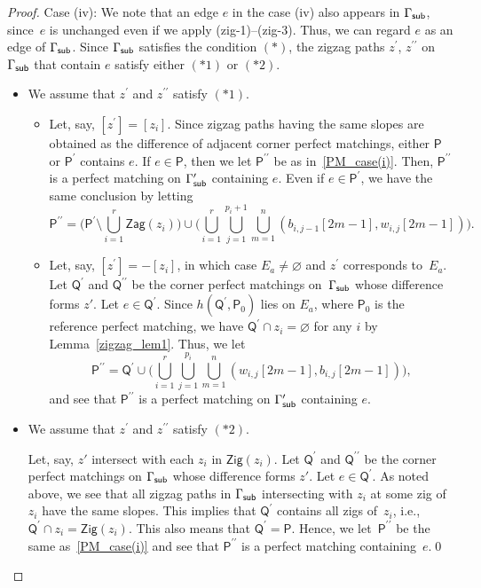 \documentclass[11pt]{article}
\numberwithin{equation}{section}
\numberwithin{equation}{section}
\numberwithin{figure}{section}
\numberwithin{table}{section}
\newcommand{\sfP}{\mathsf{P}}
\newcommand{\sfQ}{\mathsf{Q}}
\newcommand{\Zig}{\mathsf{Zig}}
\newcommand{\Zag}{\mathsf{Zag}}
\begin{document}
\begin{proof}
Case (iv): We note that an edge $e$ in the case (iv) also appears in $\Gamma_{\sf sub}$, since~$e$ is unchanged even if we apply (zig-1)--(zig-3).
Thus, we can regard $e$ as an edge of $\Gamma_{\sf sub}$.
Since $\Gamma_{\sf sub}$ satisfies the condition $(*)$, the zigzag paths $z^\prime$, $z^{\prime\prime}$ on~$\Gamma_{\sf sub}$ that contain $e$ satisfy
either $(*1)$ or $(*2)$.
\begin{itemize}\itemsep=0pt
\item We assume that $z^\prime$ and $z^{\prime\prime}$ satisfy $(*1)$.
\begin{itemize}\itemsep=0pt
\item Let, say, $[z^\prime]=[z_i]$.
Since zigzag paths having the same slopes are obtained as the difference of adjacent corner perfect matchings, either $\sfP$ or $\sfP^\prime$ contains $e$.
If $e \in \sfP$, then we let $\sfP^{\prime\prime}$ be as in~\eqref{PM_case(i)}.
Then, $\sfP^{\prime\prime}$ is a perfect matching on $\Gamma^\prime_{\sf sub}$ containing $e$.
Even if $e \in \sfP^\prime$, we have the same conclusion by letting
\begin{displaymath}
\sfP^{\prime\prime}=\bigg(\sfP^\prime \setminus \bigcup_{i=1}^r \Zag(z_i)\bigg) \cup \bigg(\bigcup_{i=1}^r \bigcup_{j=1}^{p_i+1} \bigcup_{m=1}^n(b_{i,j-1}[2m-1],w_{i,j}[2m-1])\bigg).
\end{displaymath}
\item Let, say, $[z^\prime]=-[z_i]$, in which case $E_a\neq \varnothing$ and $z^\prime$ corresponds to~$E_a$.
Let $\sfQ^\prime$ and $\sfQ^{\prime\prime}$ be the corner perfect matchings on~$\Gamma_{\sf sub}$ whose difference forms $z'$. Let $e \in \sfQ^\prime$.
Since $h(\sfQ^\prime,\sfP_0)$ lies on $E_a$, where $\sfP_0$ is the reference perfect matching, we have $\sfQ^\prime\cap z_i=\varnothing$ for any $i$ by Lemma~\ref{zigzag_lem1}.
Thus, we let
\begin{displaymath}
\sfP^{\prime\prime}=\sfQ^\prime \cup \bigg(\bigcup_{i=1}^r \bigcup_{j=1}^{p_i} \bigcup_{m=1}^n(w_{i,j}[2m-1],b_{i,j}[2m-1])\bigg),
\end{displaymath}
and see that $\sfP^{\prime\prime}$ is a perfect matching on $\Gamma^\prime_{\sf sub}$ containing $e$.
\end{itemize}
\item We assume that $z^\prime$ and $z^{\prime\prime}$ satisfy $(*2)$.

Let, say, $z'$ intersect with each $z_i$ in $\Zig(z_i)$. Let $\sfQ^\prime$ and $\sfQ^{\prime\prime}$ be the corner perfect matchings on $\Gamma_{\sf sub}$ whose difference forms $z'$. Let $e \in \sfQ^\prime$.
As noted above, we see that all zigzag paths in $\Gamma_{\sf sub}$ intersecting with $z_i$ at some zig of $z_i$ have the same slopes.
This implies that $\sfQ^\prime$ contains all zigs of~$z_i$, i.e., $\sfQ^\prime \cap z_i=\Zig(z_i)$. This also means that $\sfQ^\prime=\sfP$.
Hence, we let~$\sfP^{\prime\prime}$ be the same as~\eqref{PM_case(i)} and see that $\sfP^{\prime\prime}$ is a perfect matching containing~$e$.\hfill\qed
\end{itemize}
\renewcommand{\qed}{}
\end{proof}
\end{document}
